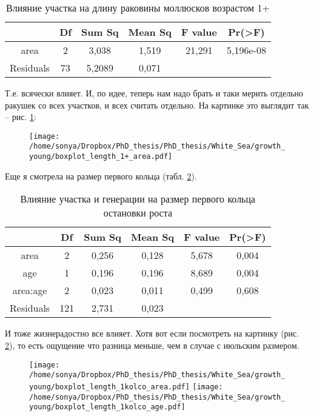 \documentclass[12pt, a4paper]{article}
\begin{document}
\begin{description}
\begin{table}
\begin{tabular}{|*{6}{c|}} \hline
&Df&Sum Sq&Mean Sq&F value&Pr(>F) \\ \hline
area & 2 & 3,038 & 1,519 &21,291 & 5,196e-08 \\ \hline
Residuals & 73 & 5,2089 & 0,071 & & \\ \hline
\end{tabular}
\caption{Влияние участка на длину раковины моллюсков возрастом 1+}
\label{tab:anova1+}
\end{table}

Т.е. всячески влияет. 
И, по идее, теперь нам надо брать и таки мерить отдельно ракушек со всех участков, и всех считать отдельно.
На картинке это выглядит так  -- рис. \ref{ris:length1area}:
	\begin{figure}[h]
	\texttt{[image: /home/sonya/Dropbox/PhD\_thesis/PhD\_thesis/White\_Sea/growth\_young/boxplot\_length\_1+\_area.pdf]}
	\caption{}
	\label{ris:length1area}
	\end{figure}

\bigskip

Еще я смотрела на размер первого кольца (табл. \ref{tab:anova1k}). 

\begin{table}
\begin{tabular}{|*{6}{c|}} \hline
&Df&Sum Sq&Mean Sq&F value&Pr(>F) \\ \hline
area & 2 & 0,256 & 0,128 & 5,678 & 0,004 \\ \hline
age & 1 & 0,196 & 0,196 & 8,689 & 0,004 \\ \hline
area:age & 2 & 0,023 & 0,011 & 0,499 & 0,608 \\ \hline
Residuals & 121 & 2,731 &0,023 & & \\ \hline
\end{tabular}
\caption{Влияние участка и генерации на размер первого кольца остановки роста}
\label{tab:anova1k}
\end{table}

И тоже жизнерадостно все влияет. 
Хотя вот если посмотреть на картинку (рис. \ref{ris:k1_age_area}), то есть ощущение что разница меньше, чем в случае с июльским размером. 

	\begin{figure}[h]
	\texttt{[image: /home/sonya/Dropbox/PhD\_thesis/PhD\_thesis/White\_Sea/growth\_young/boxplot\_length\_1kolco\_area.pdf]}
	\texttt{[image: /home/sonya/Dropbox/PhD\_thesis/PhD\_thesis/White\_Sea/growth\_young/boxplot\_length\_1kolco\_age.pdf]}
	\caption{}
	\label{ris:k1_age_area}
	\end{figure}


\end{description}
\end{document}
